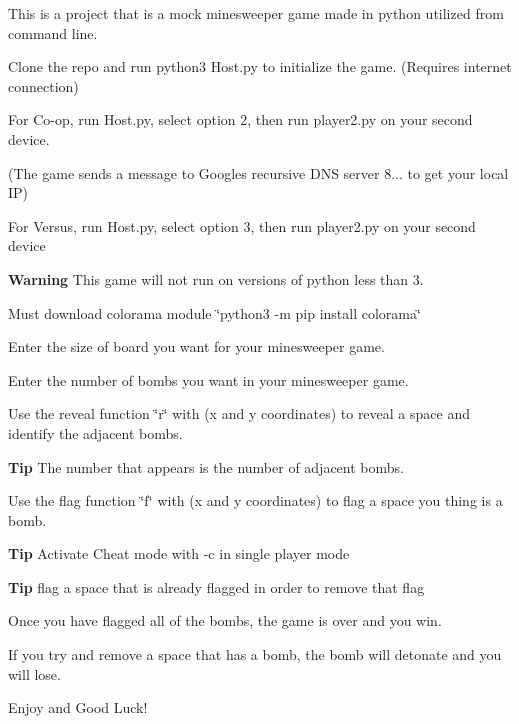 This is a project that is a mock minesweeper game made in python utilized from command line.


\begin{DoxyEnumerate}
\item Clone the repo and run python3 Host.\+py to initialize the game. (Requires internet connection)
\item For Co-\/op, run Host.\+py, select option 2, then run player2.\+py on your second device.
\end{DoxyEnumerate}

(The game sends a message to Google\textquotesingle{}s recursive D\+NS server 8... to get your local IP)


\begin{DoxyEnumerate}
\item For Versus, run Host.\+py, select option 3, then run player2.\+py on your second device
\end{DoxyEnumerate}

{\bfseries Warning} This game will not run on versions of python less than 3.

Must download colorama module \char`\"{}python3 -\/m pip install colorama\char`\"{}


\begin{DoxyEnumerate}
\item Enter the size of board you want for your minesweeper game.
\item Enter the number of bombs you want in your minesweeper game.
\item Use the reveal function \char`\"{}r\char`\"{} with (x and y coordinates) to reveal a space and identify the adjacent bombs.
\end{DoxyEnumerate}

{\bfseries Tip} The number that appears is the number of adjacent bombs.


\begin{DoxyEnumerate}
\item Use the flag function \char`\"{}f\char`\"{} with (x and y coordinates) to flag a space you thing is a bomb.
\end{DoxyEnumerate}

{\bfseries Tip} Activate Cheat mode with -\/c in single player mode

{\bfseries Tip} flag a space that is already flagged in order to remove that flag


\begin{DoxyEnumerate}
\item Once you have flagged all of the bombs, the game is over and you win.
\item If you try and remove a space that has a bomb, the bomb will detonate and you will lose.
\item Enjoy and Good Luck! 
\end{DoxyEnumerate}